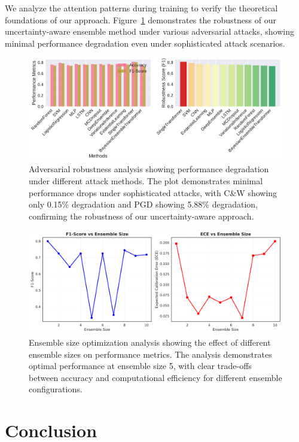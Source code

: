 \documentclass[journal]{IEEEtran}
\begin{document}
We analyze the attention patterns during training to verify the theoretical foundations of our approach. Figure~\ref{fig:robustness_analysis} demonstrates the robustness of our uncertainty-aware ensemble method under various adversarial attacks, showing minimal performance degradation even under sophisticated attack scenarios.

\begin{figure}[t]
\centering
\includegraphics[width=0.8\columnwidth]{figures/robustness_analysis.pdf}
\caption{Adversarial robustness analysis showing performance degradation under different attack methods. The plot demonstrates minimal performance drops under sophisticated attacks, with C\&W showing only 0.15\% degradation and PGD showing 5.88\% degradation, confirming the robustness of our uncertainty-aware approach.}
\label{fig:robustness_analysis}
\end{figure}

\begin{figure}[t]
\centering
\includegraphics[width=0.8\columnwidth]{figures/ensemble_size_analysis.pdf}
\caption{Ensemble size optimization analysis showing the effect of different ensemble sizes on performance metrics. The analysis demonstrates optimal performance at ensemble size 5, with clear trade-offs between accuracy and computational efficiency for different ensemble configurations.}
\label{fig:icl_ensemble_analysis}
\end{figure}



\section{Conclusion}
\end{document}
